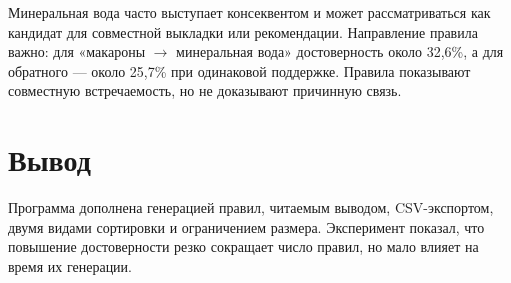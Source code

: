 \documentclass[12pt,a4paper]{article}
\begin{document}
Минеральная вода часто выступает консеквентом и может рассматриваться как кандидат для совместной выкладки или рекомендации. Направление правила важно: для «макароны $\to$ минеральная вода» достоверность около 32{,}6\%, а для обратного --- около 25{,}7\% при одинаковой поддержке. Правила показывают совместную встречаемость, но не доказывают причинную связь.

\section{Вывод}
Программа дополнена генерацией правил, читаемым выводом, CSV-экспортом, двумя видами сортировки и ограничением размера. Эксперимент показал, что повышение достоверности резко сокращает число правил, но мало влияет на время их генерации.
\end{document}
